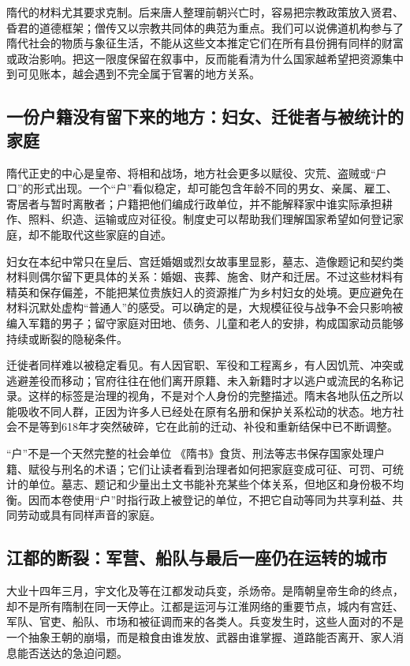 隋代的材料尤其要求克制。后来唐人整理前朝兴亡时，容易把宗教政策放入贤君、昏君的道德框架；僧传又以宗教共同体的典范为重点。我们可以说佛道机构参与了隋代社会的物质与象征生活，不能从这些文本推定它们在所有县份拥有同样的财富或政治影响。把这一限度保留在叙事中，反而能看清为什么国家越希望把资源集中到可见账本，越会遇到不完全属于官署的地方关系。

\subsection{一份户籍没有留下来的地方：妇女、迁徙者与被统计的家庭}
隋代正史的中心是皇帝、将相和战场，地方社会更多以赋役、灾荒、盗贼或“户口”的形式出现。一个“户”看似稳定，却可能包含年龄不同的男女、亲属、雇工、寄居者与暂时离散者；户籍把他们编成行政单位，并不能解释家中谁实际承担耕作、照料、织造、运输或应对征役。制度史可以帮助我们理解国家希望如何登记家庭，却不能取代这些家庭的自述。

妇女在本纪中常只在皇后、宫廷婚姻或烈女故事里显影，墓志、造像题记和契约类材料则偶尔留下更具体的关系：婚姻、丧葬、施舍、财产和迁居。不过这些材料有精英和保存偏差，不能把某位贵族妇人的资源推广为乡村妇女的处境。更应避免在材料沉默处虚构“普通人”的感受。可以确定的是，大规模征役与战争不会只影响被编入军籍的男子；留守家庭对田地、债务、儿童和老人的安排，构成国家动员能够持续或断裂的隐秘条件。

迁徙者同样难以被稳定看见。有人因官职、军役和工程离乡，有人因饥荒、冲突或逃避差役而移动；官府往往在他们离开原籍、未入新籍时才以逃户或流民的名称记录。这样的标签是治理的视角，不是对个人身份的完整描述。隋末各地队伍之所以能吸收不同人群，正因为许多人已经处在原有名册和保护关系松动的状态。地方社会不是等到618年才突然破碎，它在此前的迁动、补役和重新结保中已不断调整。

\begin{textwindow}{“户”不是一个天然完整的社会单位}
《隋书》食货、刑法等志书保存国家处理户籍、赋役与刑名的术语；它们让读者看到治理者如何把家庭变成可征、可罚、可统计的单位。墓志、题记和少量出土文书能补充某些个体关系，但地区和身份极不均衡。因而本卷使用“户”时指行政上被登记的单位，不把它自动等同为共享利益、共同劳动或具有同样声音的家庭。
\end{textwindow}

\subsection{江都的断裂：军营、船队与最后一座仍在运转的城市}
大业十四年三月，宇文化及等在江都发动兵变，杀炀帝。是隋朝皇帝生命的终点，却不是所有隋制在同一天停止。江都是运河与江淮网络的重要节点，城内有宫廷、军队、官吏、船队、市场和被征调而来的各类人。兵变发生时，这些人面对的不是一个抽象王朝的崩塌，而是粮食由谁发放、武器由谁掌握、道路能否离开、家人消息能否送达的急迫问题。

